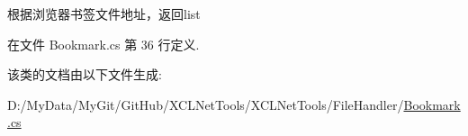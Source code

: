 根据浏览器书签文件地址，返回list 



在文件 Bookmark.\-cs 第 36 行定义.



该类的文档由以下文件生成\-:\begin{DoxyCompactItemize}
\item 
D\-:/\-My\-Data/\-My\-Git/\-Git\-Hub/\-X\-C\-L\-Net\-Tools/\-X\-C\-L\-Net\-Tools/\-File\-Handler/\hyperlink{_bookmark_8cs}{Bookmark.\-cs}\end{DoxyCompactItemize}

